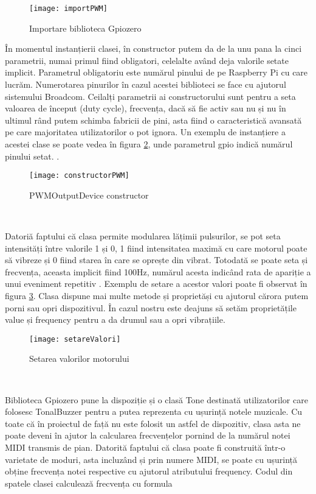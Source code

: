 \documentclass[../IoMusT.tex]{subfiles}
\begin{document}
\begin{figure}[h]
\centering
\texttt{[image: importPWM]}
\caption{Importare biblioteca Gpiozero}
\label{fig:import}
\end{figure}
În momentul instanțierii clasei, în constructor putem da de la unu pana la cinci parametrii, numai primul fiind obligatori, celelalte având deja valorile setate implicit. Parametrul obligatoriu este numărul pinului de pe Raspberry Pi cu care lucrăm. Numerotarea pinurilor în cazul acestei biblioteci se face cu ajutorul sistemului Broadcom. Ceilalți parametrii ai constructorului sunt pentru a seta valoarea de început (duty cycle), frecvența, dacă să fie activ sau nu și nu în ultimul rând putem schimba fabricii de pini, asta fiind o caracteristică avansată pe care majoritatea utilizatorilor o pot ignora. Un exemplu de instanțiere a acestei clase se poate vedea în figura \ref{fig:constructor}, unde parametrul gpio indică numărul pinului setat. .
\begin{figure}[h]
\centering
\texttt{[image: constructorPWM]}
\caption{PWMOutputDevice constructor}
\label{fig:constructor}
\end{figure}
\\
\par Datoriă faptului că clasa permite modularea lățimii pulsurilor, se pot seta intensități între valorile 1 și 0, 1 fiind intensitatea maximă cu care motorul poate să vibreze și 0 fiind starea în care se oprește din vibrat. Totodată se poate seta și frecvența, aceasta implicit fiind 100Hz, numărul acesta indicând rata de apariție a unui eveniment repetitiv \cite{Freq}. Exemplu de setare a acestor valori poate fi observat în figura \ref{fig:val}. Clasa dispune mai multe metode și proprietăși cu ajutorul cărora putem porni sau opri dispozitivul. În cazul nostru este deajuns să setăm proprietățile value și frequency pentru a da drumul sau a opri vibrațiile. 
\begin{figure}[h]
\centering
\texttt{[image: setareValori]}
\caption{Setarea valorilor motorului}
\label{fig:val}
\end{figure}
\\
\par Biblioteca Gpiozero pune la dispoziție și o clasă Tone destinată utilizatorilor care folosesc TonalBuzzer pentru a putea reprezenta cu ușurință notele muzicale. Cu toate că în proiectul de față nu este folosit un astfel de dispozitiv, clasa asta ne poate deveni în ajutor la calcularea frecvențelor pornind de la numărul notei MIDI transmis de pian. Datorită faptului că clasa poate fi construită într-o varietate de moduri, asta incluzând și prin numere MIDI, se poate cu ușurință obține frecvența notei respective cu ajutorul atributului frequency. Codul din spatele clasei calculează frecvența cu formula
\end{document}

